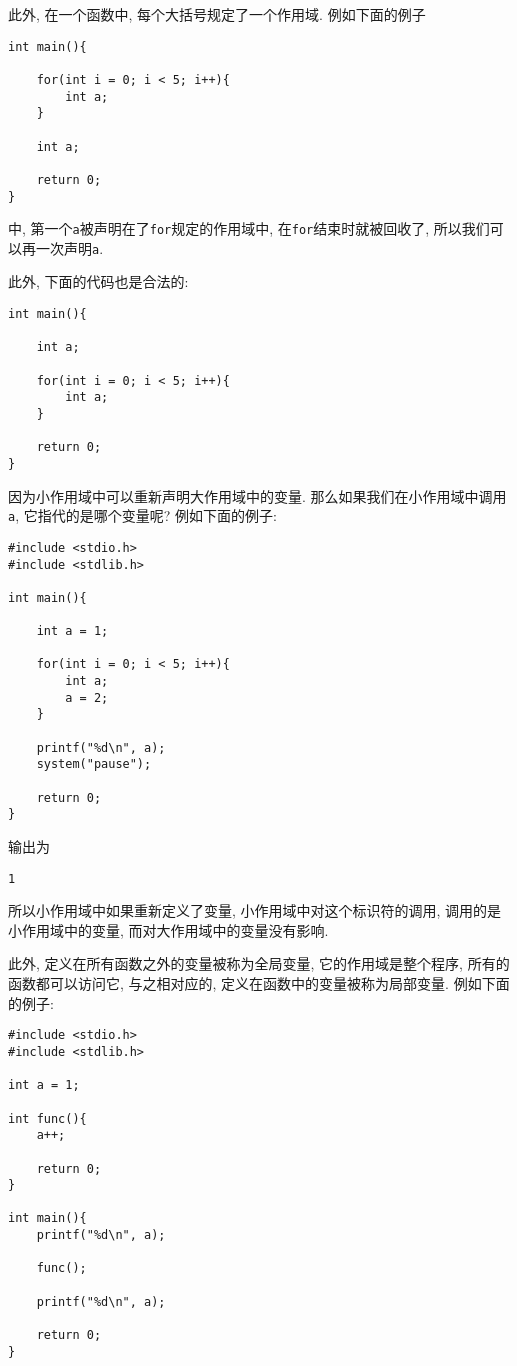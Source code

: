         此外, 在一个函数中, 每个大括号规定了一个作用域. 例如下面的例子
\begin{lstlisting}
int main(){

    for(int i = 0; i < 5; i++){
        int a;
    }

    int a;

    return 0;
}
\end{lstlisting}
        中, 第一个\texttt{a}被声明在了\texttt{for}规定的作用域中, 在\texttt{for}结束时就被回收了, 所以我们可以再一次声明\texttt{a}.

        此外, 下面的代码也是合法的:
\begin{lstlisting}
int main(){

    int a;

    for(int i = 0; i < 5; i++){
        int a;
    }

    return 0;
}
\end{lstlisting}

        因为小作用域中可以重新声明大作用域中的变量. 那么如果我们在小作用域中调用\texttt{a}, 它指代的是哪个变量呢? 例如下面的例子:
\begin{lstlisting}
#include <stdio.h>
#include <stdlib.h>

int main(){

    int a = 1;

    for(int i = 0; i < 5; i++){
        int a;
        a = 2;
    }

    printf("%d\n", a);
    system("pause");

    return 0;
}
\end{lstlisting}

        输出为
\begin{lstlisting}
1
\end{lstlisting}
        所以小作用域中如果重新定义了变量, 小作用域中对这个标识符的调用, 调用的是小作用域中的变量, 而对大作用域中的变量没有影响.

        此外, 定义在所有函数之外的变量被称为全局变量, 它的作用域是整个程序, 所有的函数都可以访问它, 与之相对应的, 定义在函数中的变量被称为局部变量. 例如下面的例子:
\begin{lstlisting}
#include <stdio.h>
#include <stdlib.h>

int a = 1;

int func(){
    a++;

    return 0;
}

int main(){
    printf("%d\n", a);

    func();

    printf("%d\n", a);
    
    return 0;
}
\end{lstlisting}


